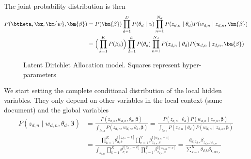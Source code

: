 The joint probability distribution is then
\[
  \begin{aligned}
    P(\btheta, \bz, \bm{w}, \bm{\beta})
    &= P(\bm{\beta})\prod_{d=1}^{D}P(\theta_{d}\mid \alpha)\prod_{n=1}^{N_{d}}P(z_{d,n}\mid \theta_{d})P(w_{d,n} \mid z_{d,n}, \bm{\beta})\\
    &= \Big( \prod_{k=1}^{K}P(\beta_{k}) \Big)\prod_{d=1}^{D}P(\theta_{d})\prod_{n=1}^{N_{d}}P(z_{d,n}\mid \theta_{d})P(w_{d,n} \mid z_{d,n}, \bm{\beta})
  \end{aligned}
\]

\begin{figure}[h!]
  \centering
  \caption{Latent Dirichlet Allocation model. Squares represent hyper-parameters}\label{fig:lda}
\end{figure}


We start setting the complete conditional distribution of the local hidden variables. They only depend on other variables in the local context (same document) and the global variables
\[
  \begin{aligned}
    P(z_{d,n} \mid w_{d,n}, \theta_{d}, \bm{\beta}) &= \frac{P(z_{d,n}, w_{d,n}, \theta_{d}, \bm{\beta})}{\int_{z_{n,d}}P(z_{d,n}, w_{d,n}, \theta_{d}, \bm{\beta})} = \frac{P(z_{d,n}\mid \theta_{d})P(w_{d,n}\mid z_{d,n},\bm{\beta})}{ \int_{z_{d,n}} P(z_{d,n}\mid \theta_{d})P(w_{d,n}\mid z_{d,n},\bm{\beta}) }\\
    &= \frac{ \prod_{k=1}^{K} \theta_{d,k}^{\mathbb{I}[z_{d,n}=k]} \prod_{v=1}^{V}\beta_{z_{d,n},v}^{\mathbb{I}[w_{d,n}=v]}}{ \int_{z_{d,n}}  \prod_{k=1}^{K} \theta_{d,k}^{\mathbb{I}[z_{d,n}=k]} \prod_{v=1}^{V}\beta_{z_{d,n},v}^{\mathbb{I}[w_{d,n}=v]}} = \frac{\theta_{d, z_{d,n}}\beta_{z_{d,n},w_{d,n}}}{ \sum_{k=1}^{K} \theta_{d, k}\beta_{k,w_{d,n}}}
  \end{aligned}
\]

